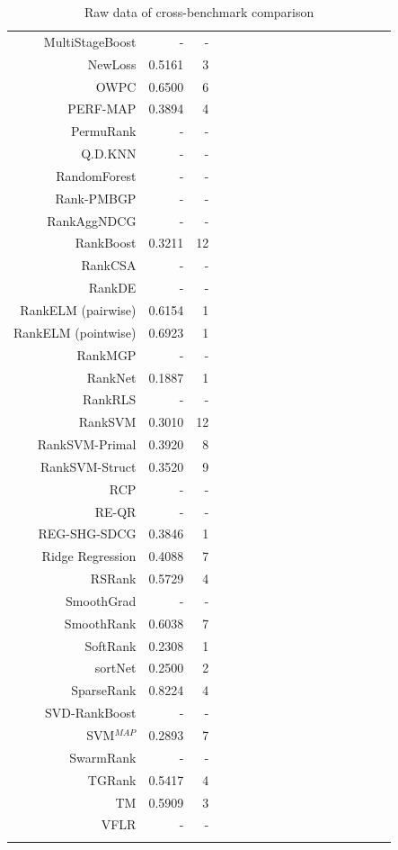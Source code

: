 \documentclass{sig-alternate-2013}
\begin{document}
\begin{longtable}{@{}rrrrrrrrrrrrrrrrr@{}}
MultiStageBoost & - & - && & && & && & && & & \\
NewLoss & 0.5161 & 3 && & && & && & && & & \\
OWPC & 0.6500 & 6 && & && & && & && & & \\
PERF-MAP & 0.3894 & 4 && & && & && & && & & \\
PermuRank & - & - && & && & && & && & & \\
Q.D.KNN & - & - && & && & && & && & & \\
RandomForest & - & - && & && & && & && & & \\
Rank-PMBGP & - & - && & && & && & && & & \\
RankAggNDCG & - & - && & && & && & && & & \\
RankBoost & 0.3211 & 12 && & && & && & && & & \\
RankCSA & - & - && & && & && & && & & \\
RankDE & - & - && & && & && & && & & \\
RankELM (pairwise) & 0.6154 & 1 && & && & && & && & & \\
RankELM (pointwise) & 0.6923 & 1 && & && & && & && & & \\
RankMGP & - & - && & && & && & && & & \\
RankNet & 0.1887 & 1 && & && & && & && & & \\
RankRLS & - & - && & && & && & && & & \\
RankSVM & 0.3010 & 12 && & && & && & && & & \\
RankSVM-Primal & 0.3920 & 8 && & && & && & && & & \\
RankSVM-Struct & 0.3520 & 9 && & && & && & && & & \\
RCP & - & - && & && & && & && & & \\
RE-QR & - & - && & && & && & && & & \\
REG-SHG-SDCG & 0.3846 & 1 && & && & && & && & & \\
Ridge Regression & 0.4088 & 7 && & && & && & && & & \\
RSRank & 0.5729 & 4 && & && & && & && & & \\
SmoothGrad & - & - && & && & && & && & & \\
SmoothRank & 0.6038 & 7 && & && & && & && & & \\
SoftRank & 0.2308 & 1 && & && & && & && & & \\
sortNet & 0.2500 & 2 && & && & && & && & & \\
SparseRank & 0.8224 & 4 && & && & && & && & & \\
SVD-RankBoost & - & - && & && & && & && & & \\
SVM$^{MAP}$ & 0.2893 & 7 && & && & && & && & & \\
SwarmRank & - & - && & && & && & && & & \\
TGRank & 0.5417 & 4 && & && & && & && & & \\
TM & 0.5909 & 3 && & && & && & && & & \\
VFLR & - & - && & && & && & && & & \\
\bottomrule
\caption{Raw data of cross-benchmark comparison}
\label{tab:raw_data}
\end{longtable}
\end{document}
